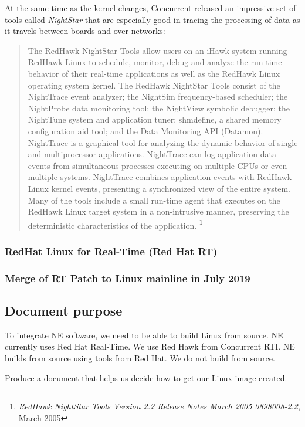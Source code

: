 \documentclass[12pt]{article}
\begin{document}
At the same time as the kernel changes, Concurrent released an impressive set of
tools called \emph{NightStar} that are especially good in tracing the processing
of data as it travels between boards and over networks:

\begin{quote}
The RedHawk NightStar Tools allow users on an iHawk system running
RedHawk Linux to schedule, monitor, debug and analyze the run time behavior of
their real-time applications as well as the RedHawk Linux operating system
kernel.  The RedHawk NightStar Tools consist of the NightTrace event analyzer;
the NightSim frequency-based scheduler; the NightProbe data monitoring tool; the
NightView symbolic debugger; the NightTune system and application tuner;
shmdefine, a shared memory configuration aid tool; and the Data Monitoring API
(Datamon).  NightTrace is a graphical tool for analyzing the dynamic behavior of
single and multiprocessor applications. NightTrace can log application data
events from simultaneous processes executing on multiple CPUs or even multiple
systems. NightTrace combines application events with RedHawk Linux kernel
events, presenting a synchronized view of the entire system.  Many of the tools
include a small run-time agent that executes on the RedHawk Linux target system
in a non-intrusive manner, preserving the deterministic characteristics of the
application.%
\footnote{\emph{RedHawk NightStar Tools Version 2.2 Release Notes March 2005
0898008-2.2}, March 2005}
\end{quote}


\subsubsection{RedHat Linux for Real-Time (Red Hat RT)}


\subsubsection{Merge of RT Patch to Linux mainline in July 2019}

\subsection{Document purpose}
To integrate NE software, we need to be able to build Linux from source.  NE
currently uses Red Hat Real-Time.  We use Red Hawk from Concurrent RTI.  NE
builds from source using tools from Red Hat.  We do not build from source.

Produce a document that helps us decide how to get our Linux image created.
\end{document}
